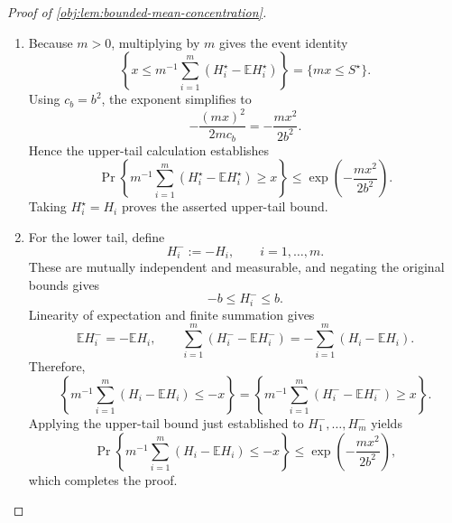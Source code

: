 \begin{proof}[Proof of \cref{obj:lem:bounded-mean-concentration}]
\begin{enumerate}
\item
Because \(m>0\), multiplying by \(m\) gives the event identity
\[
\left\{
x\le m^{-1}\sum_{i=1}^m
(H_i^\star-\mathbb EH_i^\star)
\right\}
=
\{mx\le S^\star\}.
\]
Using \(c_b=b^2\), the exponent simplifies to
\[
-\frac{(mx)^2}{2mc_b}
=
-\frac{mx^2}{2b^2}.
\]
Hence the upper-tail calculation establishes
\[
\Pr\left\{
m^{-1}\sum_{i=1}^m(H_i^\star-\mathbb EH_i^\star)\ge x
\right\}
\le
\exp\left(-\frac{mx^2}{2b^2}\right).
\]
Taking \(H_i^\star=H_i\) proves the asserted upper-tail bound.

\item
For the lower tail, define
\[
H_i^-:=-H_i,
\qquad i=1,\ldots,m.
\]
These are mutually independent and measurable, and negating the original bounds gives
\[
-b\le H_i^-\le b.
\]
Linearity of expectation and finite summation gives
\[
\mathbb EH_i^-=-\mathbb EH_i,
\qquad
\sum_{i=1}^m(H_i^--\mathbb EH_i^-)
=
-\sum_{i=1}^m(H_i-\mathbb EH_i).
\]
Therefore,
\[
\left\{
m^{-1}\sum_{i=1}^m(H_i-\mathbb EH_i)\le-x
\right\}
=
\left\{
m^{-1}\sum_{i=1}^m(H_i^--\mathbb EH_i^-)\ge x
\right\}.
\]
Applying the upper-tail bound just established to \(H_1^-,\ldots,H_m^-\) yields
\[
\Pr\left\{
m^{-1}\sum_{i=1}^m(H_i-\mathbb EH_i)\le-x
\right\}
\le
\exp\left(-\frac{mx^2}{2b^2}\right),
\]
which completes the proof.
\end{enumerate}
\end{proof}

